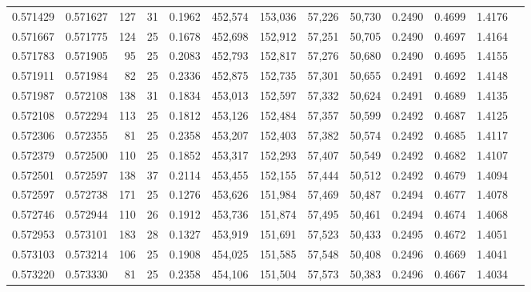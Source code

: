 \begin{tabular}{rrrrrrrrrrrrr}
0.571429 & 0.571627 &    127 &    31 &                                     0.1962 & 452,574 & 153,036 &  57,226 &  50,730 & 0.2490 & 0.4699 & 1.4176 \\
0.571667 & 0.571775 &    124 &    25 &                                     0.1678 & 452,698 & 152,912 &  57,251 &  50,705 & 0.2490 & 0.4697 & 1.4164 \\
0.571783 & 0.571905 &     95 &    25 &                                     0.2083 & 452,793 & 152,817 &  57,276 &  50,680 & 0.2490 & 0.4695 & 1.4155 \\
0.571911 & 0.571984 &     82 &    25 &                                     0.2336 & 452,875 & 152,735 &  57,301 &  50,655 & 0.2491 & 0.4692 & 1.4148 \\
0.571987 & 0.572108 &    138 &    31 &                                     0.1834 & 453,013 & 152,597 &  57,332 &  50,624 & 0.2491 & 0.4689 & 1.4135 \\
0.572108 & 0.572294 &    113 &    25 &                                     0.1812 & 453,126 & 152,484 &  57,357 &  50,599 & 0.2492 & 0.4687 & 1.4125 \\
0.572306 & 0.572355 &     81 &    25 &                                     0.2358 & 453,207 & 152,403 &  57,382 &  50,574 & 0.2492 & 0.4685 & 1.4117 \\
0.572379 & 0.572500 &    110 &    25 &                                     0.1852 & 453,317 & 152,293 &  57,407 &  50,549 & 0.2492 & 0.4682 & 1.4107 \\
0.572501 & 0.572597 &    138 &    37 &                                     0.2114 & 453,455 & 152,155 &  57,444 &  50,512 & 0.2492 & 0.4679 & 1.4094 \\
0.572597 & 0.572738 &    171 &    25 &                                     0.1276 & 453,626 & 151,984 &  57,469 &  50,487 & 0.2494 & 0.4677 & 1.4078 \\
0.572746 & 0.572944 &    110 &    26 &                                     0.1912 & 453,736 & 151,874 &  57,495 &  50,461 & 0.2494 & 0.4674 & 1.4068 \\
0.572953 & 0.573101 &    183 &    28 &                                     0.1327 & 453,919 & 151,691 &  57,523 &  50,433 & 0.2495 & 0.4672 & 1.4051 \\
0.573103 & 0.573214 &    106 &    25 &                                     0.1908 & 454,025 & 151,585 &  57,548 &  50,408 & 0.2496 & 0.4669 & 1.4041 \\
0.573220 & 0.573330 &     81 &    25 &                                     0.2358 & 454,106 & 151,504 &  57,573 &  50,383 & 0.2496 & 0.4667 & 1.4034 \\

\end{tabular}
